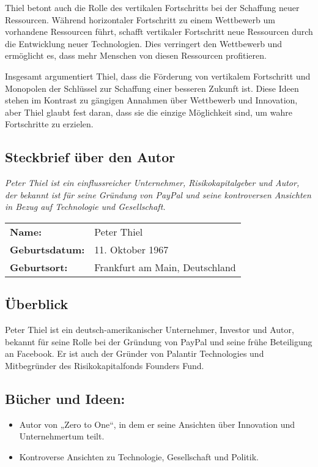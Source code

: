 \documentclass[10pt]{article}
\begin{document}
Thiel betont auch die Rolle des vertikalen Fortschritts bei der Schaffung neuer Ressourcen. Während horizontaler Fortschritt zu einem Wettbewerb um vorhandene Ressourcen führt, schafft vertikaler Fortschritt neue Ressourcen durch die Entwicklung neuer Technologien. Dies verringert den Wettbewerb und ermöglicht es, dass mehr Menschen von diesen Ressourcen profitieren.

Insgesamt argumentiert Thiel, dass die Förderung von vertikalem Fortschritt und Monopolen der Schlüssel zur Schaffung einer besseren Zukunft ist. Diese Ideen stehen im Kontrast zu gängigen Annahmen über Wettbewerb und Innovation, aber Thiel glaubt fest daran, dass sie die einzige Möglichkeit sind, um wahre Fortschritte zu erzielen.

\clearpage


\begin{center}
\section*{Steckbrief über den Autor}
\textit{Peter Thiel ist ein einflussreicher Unternehmer, Risikokapitalgeber und Autor, der bekannt ist für seine Gründung von PayPal und seine kontroversen Ansichten in Bezug auf Technologie und Gesellschaft.}
\end{center}

\begin{tabular}{ll}
\textbf{Name:} & Peter Thiel \\
\textbf{Geburtsdatum:} & 11. Oktober 1967 \\
\textbf{Geburtsort:} & Frankfurt am Main, Deutschland \\
\end{tabular}

\subsection*{Überblick}
Peter Thiel ist ein deutsch-amerikanischer Unternehmer, Investor und Autor, bekannt für seine Rolle bei der Gründung von PayPal und seine frühe Beteiligung an Facebook. Er ist auch der Gründer von Palantir Technologies und Mitbegründer des Risikokapitalfonds Founders Fund.

\subsection*{Bücher und Ideen:}
\begin{itemize}
\item Autor von „Zero to One“, in dem er seine Ansichten über Innovation und Unternehmertum teilt.
\item Kontroverse Ansichten zu Technologie, Gesellschaft und Politik.
\end{itemize}
\end{document}

